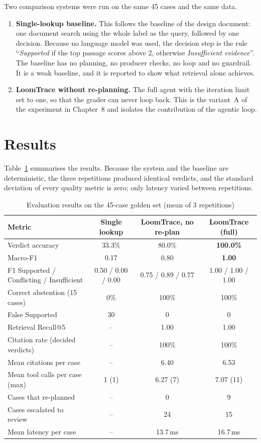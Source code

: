 Two comparison systems were run on the same 45 cases and the same data.

\begin{enumerate}[itemsep=2pt]
\item \textbf{Single-lookup baseline.} This follows the baseline of the design document: one document
search using the whole label as the query, followed by one decision. Because no language model was
used, the decision step is the rule ``\emph{Supported} if the top passage scores above 2, otherwise
\emph{Insufficient evidence}''. The baseline has no planning, no producer checks, no loop and no
guardrail. It is a weak baseline, and it is reported to show what retrieval alone achieves.
\item \textbf{LoomTrace without re-planning.} The full agent with the iteration limit set to one, so
that the grader can never loop back. This is the variant~A of the experiment in Chapter~8 and isolates
the contribution of the agentic loop.
\end{enumerate}

\section{Results}

Table~\ref{tab:results} summarises the results. Because the system and the baseline are deterministic,
the three repetitions produced identical verdicts, and the standard deviation of every quality metric
is zero; only latency varied between repetitions.

\begin{table}[H]
\centering
\caption{Evaluation results on the 45-case golden set (mean of 3 repetitions)}
\label{tab:results}
\small
\begin{tabularx}{\linewidth}{@{}>{\raggedright\arraybackslash}X c c c@{}}
\toprule
\textbf{Metric} & \textbf{Single lookup} & \textbf{LoomTrace, no re-plan} & \textbf{LoomTrace (full)} \\ \midrule
Verdict accuracy & 33.3\% & 80.0\% & \textbf{100.0\%} \\
Macro-F1 & 0.17 & 0.80 & \textbf{1.00} \\
F1 Supported / Conflicting / Insufficient & 0.50 / 0.00 / 0.00 & 0.75 / 0.89 / 0.77 & 1.00 / 1.00 / 1.00 \\
Correct abstention (15 cases) & 0\% & 100\% & 100\% \\
False Supported & 30 & 0 & 0 \\
Retrieval Recall@5 & -- & 1.00 & 1.00 \\
Citation rate (decided verdicts) & -- & 100\% & 100\% \\
Mean citations per case & -- & 6.40 & 6.53 \\
Mean tool calls per case (max) & 1 (1) & 6.27 (7) & 7.07 (11) \\
Cases that re-planned & -- & 0 & 9 \\
Cases escalated to review & -- & 24 & 15 \\
Mean latency per case & -- & 13.7\,ms & 16.7\,ms \\
\bottomrule
\end{tabularx}
\end{table}

